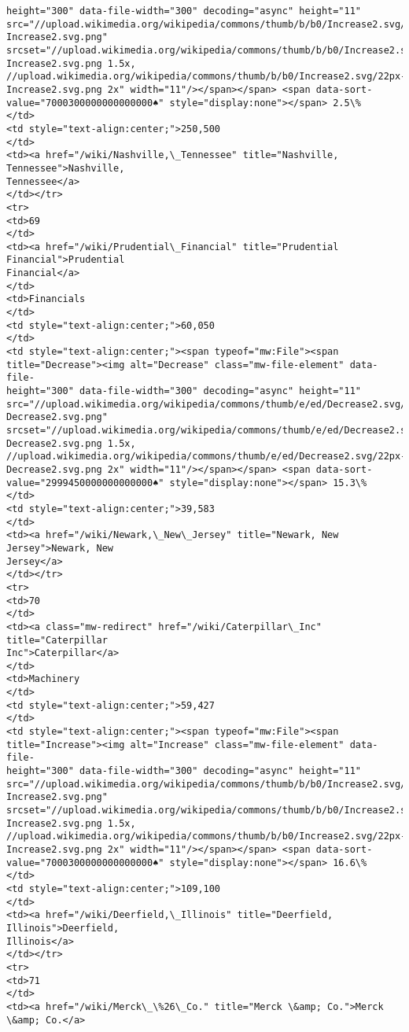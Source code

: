 \documentclass[11pt]{article}
\begin{document}
\begin{Verbatim}[commandchars=\\\{\}]
height="300" data-file-width="300" decoding="async" height="11"
src="//upload.wikimedia.org/wikipedia/commons/thumb/b/b0/Increase2.svg/11px-
Increase2.svg.png"
srcset="//upload.wikimedia.org/wikipedia/commons/thumb/b/b0/Increase2.svg/17px-
Increase2.svg.png 1.5x,
//upload.wikimedia.org/wikipedia/commons/thumb/b/b0/Increase2.svg/22px-
Increase2.svg.png 2x" width="11"/></span></span> <span data-sort-
value="7000300000000000000♠" style="display:none"></span> 2.5\%
</td>
<td style="text-align:center;">250,500
</td>
<td><a href="/wiki/Nashville,\_Tennessee" title="Nashville, Tennessee">Nashville,
Tennessee</a>
</td></tr>
<tr>
<td>69
</td>
<td><a href="/wiki/Prudential\_Financial" title="Prudential Financial">Prudential
Financial</a>
</td>
<td>Financials
</td>
<td style="text-align:center;">60,050
</td>
<td style="text-align:center;"><span typeof="mw:File"><span
title="Decrease"><img alt="Decrease" class="mw-file-element" data-file-
height="300" data-file-width="300" decoding="async" height="11"
src="//upload.wikimedia.org/wikipedia/commons/thumb/e/ed/Decrease2.svg/11px-
Decrease2.svg.png"
srcset="//upload.wikimedia.org/wikipedia/commons/thumb/e/ed/Decrease2.svg/17px-
Decrease2.svg.png 1.5x,
//upload.wikimedia.org/wikipedia/commons/thumb/e/ed/Decrease2.svg/22px-
Decrease2.svg.png 2x" width="11"/></span></span> <span data-sort-
value="2999450000000000000♠" style="display:none"></span> 15.3\%
</td>
<td style="text-align:center;">39,583
</td>
<td><a href="/wiki/Newark,\_New\_Jersey" title="Newark, New Jersey">Newark, New
Jersey</a>
</td></tr>
<tr>
<td>70
</td>
<td><a class="mw-redirect" href="/wiki/Caterpillar\_Inc" title="Caterpillar
Inc">Caterpillar</a>
</td>
<td>Machinery
</td>
<td style="text-align:center;">59,427
</td>
<td style="text-align:center;"><span typeof="mw:File"><span
title="Increase"><img alt="Increase" class="mw-file-element" data-file-
height="300" data-file-width="300" decoding="async" height="11"
src="//upload.wikimedia.org/wikipedia/commons/thumb/b/b0/Increase2.svg/11px-
Increase2.svg.png"
srcset="//upload.wikimedia.org/wikipedia/commons/thumb/b/b0/Increase2.svg/17px-
Increase2.svg.png 1.5x,
//upload.wikimedia.org/wikipedia/commons/thumb/b/b0/Increase2.svg/22px-
Increase2.svg.png 2x" width="11"/></span></span> <span data-sort-
value="7000300000000000000♠" style="display:none"></span> 16.6\%
</td>
<td style="text-align:center;">109,100
</td>
<td><a href="/wiki/Deerfield,\_Illinois" title="Deerfield, Illinois">Deerfield,
Illinois</a>
</td></tr>
<tr>
<td>71
</td>
<td><a href="/wiki/Merck\_\%26\_Co." title="Merck \&amp; Co.">Merck \&amp; Co.</a>

\end{Verbatim}
\end{document}
